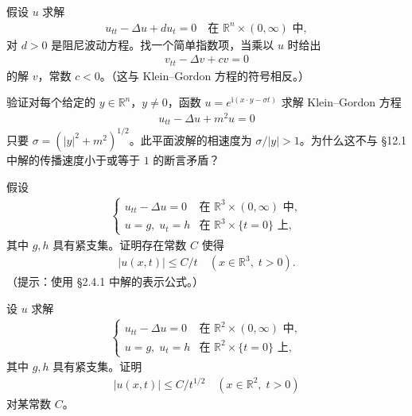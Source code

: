 \documentclass[../../main.tex]{subfiles}
\begin{document}
\begin{exercise}\label{exercise:ch12-阻尼}
假设 $u$ 求解
\begin{align*}
u_{tt}-\Delta u+du_t=0 \quad \text{在 } \mathbb{R}^n\times(0,\infty) \text{ 中},
\end{align*}
对 $d>0$ 是阻尼波动方程。找一个简单指数项，当乘以 $u$ 时给出
\begin{align*}
v_{tt}-\Delta v+cv=0
\end{align*}
的解 $v$，常数 $c<0$。（这与 Klein--Gordon 方程的符号相反。）
\end{exercise}

\begin{exercise}\label{exercise:ch12-相速度}
验证对每个给定的 $y\in\mathbb{R}^n$，$y\neq 0$，函数 $u=e^{\mathrm{i}(x\cdot y-\sigma t)}$ 求解 Klein--Gordon 方程
\begin{align*}
u_{tt}-\Delta u+m^2u=0
\end{align*}
只要 $\sigma=(|y|^2+m^2)^{1/2}$。此平面波解的相速度为 $\sigma/|y|>1$。为什么这不与 \S12.1 中解的传播速度小于或等于 $1$ 的断言矛盾？
\end{exercise}

\begin{exercise}\label{exercise:ch12-三维衰减}
假设
\begin{align*}
\begin{cases}
u_{tt}-\Delta u=0 & \text{在 } \mathbb{R}^3\times(0,\infty) \text{ 中},\\
u=g,\;u_t=h & \text{在 } \mathbb{R}^3\times\{t=0\} \text{ 上},
\end{cases}
\end{align*}
其中 $g,h$ 具有紧支集。证明存在常数 $C$ 使得
\begin{align*}
|u(x,t)|\leqslant C/t \quad (x\in\mathbb{R}^3,\;t>0).
\end{align*}
（提示：使用 \S2.4.1 中解的表示公式。）
\end{exercise}

\begin{exercise}\label{exercise:ch12-二维衰减}
设 $u$ 求解
\begin{align*}
\begin{cases}
u_{tt}-\Delta u=0 & \text{在 } \mathbb{R}^2\times(0,\infty) \text{ 中},\\
u=g,\;u_t=h & \text{在 } \mathbb{R}^2\times\{t=0\} \text{ 上},
\end{cases}
\end{align*}
其中 $g,h$ 具有紧支集。证明
\begin{align*}
|u(x,t)|\leqslant C/t^{1/2} \quad (x\in\mathbb{R}^2,\;t>0)
\end{align*}
对某常数 $C$。
\end{exercise}
\end{document}
